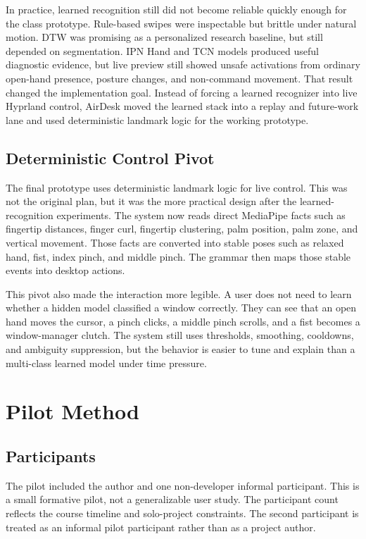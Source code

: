 \documentclass[manuscript]{acmart}
\begin{document}
In practice, learned recognition still did not become reliable quickly enough for the class prototype. Rule-based swipes were inspectable but brittle under natural motion. DTW was promising as a personalized research baseline, but still depended on segmentation. IPN Hand and TCN models produced useful diagnostic evidence, but live preview still showed unsafe activations from ordinary open-hand presence, posture changes, and non-command movement. That result changed the implementation goal. Instead of forcing a learned recognizer into live Hyprland control, AirDesk moved the learned stack into a replay and future-work lane and used deterministic landmark logic for the working prototype.

\subsection{Deterministic Control Pivot}

The final prototype uses deterministic landmark logic for live control. This was not the original plan, but it was the more practical design after the learned-recognition experiments. The system now reads direct MediaPipe facts such as fingertip distances, finger curl, fingertip clustering, palm position, palm zone, and vertical movement. Those facts are converted into stable poses such as relaxed hand, fist, index pinch, and middle pinch. The grammar then maps those stable events into desktop actions.

This pivot also made the interaction more legible. A user does not need to learn whether a hidden model classified a window correctly. They can see that an open hand moves the cursor, a pinch clicks, a middle pinch scrolls, and a fist becomes a window-manager clutch. The system still uses thresholds, smoothing, cooldowns, and ambiguity suppression, but the behavior is easier to tune and explain than a multi-class learned model under time pressure.

\section{Pilot Method}

\subsection{Participants}

The pilot included the author and one non-developer informal participant. This is a small formative pilot, not a generalizable user study. The participant count reflects the course timeline and solo-project constraints. The second participant is treated as an informal pilot participant rather than as a project author.
\end{document}
